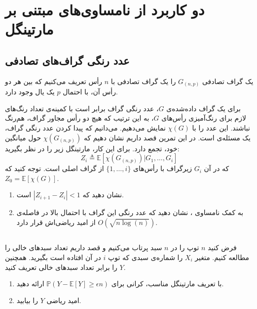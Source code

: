 \section
[دو کاربرد نامساوی‌های مبتنی بر مارتینگل]
{دو کاربرد از نامساوی‌های مبتنی بر مارتینگل}

\subsection{عدد رنگی گراف‌های تصادفی}
یک گراف تصادفی
$G_{(n, p)}$
را یک گراف تصادفی با $n$ رأس تعریف می‌کنیم که بین هر دو رأس آن، با احتمال 
$p$
یک یال وجود دارد. 

برای یک گراف داده‌‌شده‌ی 
$G$،
عدد رنگی گراف برابر است با کمینه‌ی ‌‌تعداد رنگ‌های لازم برای رنگ‌‌آمیزی رأس‌های $G$، به این ترتیب که هیچ دو رأس مجاور گراف، هم‌رنگ نباشند.  این عدد را با 
$\chi(G)$
نمایش می‌دهیم. می‌دانیم که پیدا کردن عدد رنگی گراف، یک مسئله‌ی 
است. در این تمرین قصد داریم نشان دهیم که 
$\chi(G_{(n, p)})$
حول میانگین خود، تجمع دارد.  برای این کار، مارتینگل 
زیر را در نظر بگیرید:
$$Z_i \triangleq \mathbb{E}[\chi(G_{(n, p)})|G_1, \dots, G_i]$$
که در آن $G_i$  زیر‌گراف با رأس‌های
$\{1, \dots, i\}$
از گراف اصلی است. توجه کنید که 
 $Z_0 = \mathbb{E}[\chi(G)]$.
 
 \begin{enumerate}
 \item
 نشان دهید که 
$|Z_{i+1} - Z_i|<1$
است.
\item 
به کمک نامساوی 
،
نشان دهید که عدد رنگی این گراف با احتمال بالا در فاصله‌ی
$O(\sqrt{n\log(n)})$
از امید ریاضی‌اش قرار دارد.
 \end{enumerate}

\subsection{}
 فرض ‌کنید  $n$ توپ را در $n$  سبد پرتاب می‌کنیم و قصد داریم تعداد سبد‌های خالی را مطالعه کنیم. متغیر $X_i$ را شماره‌ی سبدی که توپ $i$ در آن افتاده است بگیرید. همچنین $Y$ را برابر تعداد سبد‌های خالی تعریف کنید. 
 
 \begin{enumerate}
 \item
با تعریف مارتینگل 
 مناسب، کرانی برای 
$\mathbb{P}(Y - \mathbb{E}[Y] \geq \epsilon n)$
 ارائه دهید.
 \item 
امید ریاضی $Y$  را بیابید.
 \end{enumerate}
 